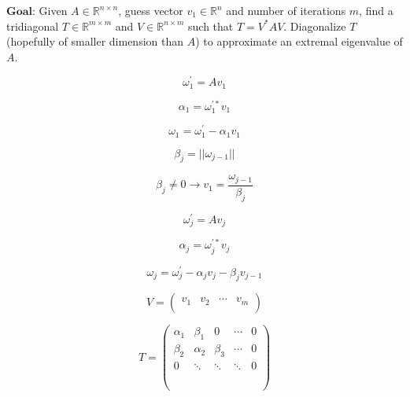 \documentclass[a4paper,12pt]{article}
\begin{document}
$\textbf{Goal}$: Given $A \in \mathbb{R}^{n \times n}$, guess vector $v_1 \in \mathbb{R}^n$ and number of iterations $m$, find a tridiagonal $T \in \mathbb{R}^{m \times m}$ and $V \in \mathbb{R}^{n\times m}$ such that $T=V^*AV$. Diagonalize $T$ (hopefully of smaller dimension than $A$) to approximate an extremal eigenvalue of $A$. 





\begin{equation}
\omega_1^{\prime}=Av_1
\end{equation}

\begin{equation}
\alpha_1=\omega_1^{\prime *} v_1
\end{equation}

\begin{equation}
\omega_1 = \omega_1^{\prime} -\alpha_1 v_1
\end{equation}

\begin{equation}
\beta_j = || \omega_{j-1} ||
\end{equation}

\begin{equation}
\beta_j \neq 0 \rightarrow v_1 = \frac{\omega_{j-1}}{ \beta_j}
\end{equation}

\begin{equation}
\omega_j^{\prime}=Av_j
\end{equation}

\begin{equation}
\alpha_j = \omega_j^{\prime *}v_j
\end{equation}

\begin{equation}
\omega_j = \omega_j^{\prime} - \alpha_j v_j - \beta_j v_{j-1}
\end{equation}

\begin{equation}
V=\begin{pmatrix}
v_1 & v_2 & \cdots & v_m \\
\end{pmatrix}
\end{equation}


\begin{equation}
T=\begin{pmatrix}
\alpha_1 & \beta_1 & 0 & \cdots & 0 \\
\beta_2 & \alpha_2 & \beta_3 & \cdots& 0 \\
	  0   &	\ddots	& \ddots &\ddots & 0\\
		& 			& 		& 	& \\
				& 			& 		& 	& \\
						& 			& 		& 	& \\
\end{pmatrix}
\end{equation}
\end{document}
